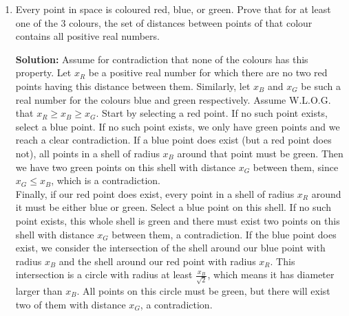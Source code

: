 \documentclass{article}
\begin{document}
\begin{enumerate}[itemsep=\fill]
\item %
Every point in space is coloured red, blue, or green. Prove that for at least one of the 3 colours, the set of distances between points of that colour contains all positive real numbers.

\textbf{Solution:} Assume for contradiction that none of the colours has this property. Let $x_R$ be a positive real number for which there are no two red points having this distance between them. Similarly, let $x_B$ and $x_G$ be such a real number for the colours blue and green respectively. Assume W.L.O.G. that $x_R\geq x_B \geq x_G$. Start by selecting a red point. If no such point exists, select a blue point. If no such point exists, we only have green points and we reach a clear contradiction. If a blue point does exist (but a red point does not), all points in a shell of radius $x_B$ around that point must be green. Then we have two green points on this shell with distance $x_G$ between them, since $x_G\leq x_B$, which is a contradiction.\\
Finally, if our red point does exist, every point in a shell of radius $x_R$ around it must be either blue or green. Select a blue point on this shell. If no such point exists, this whole shell is green and there must exist two points on this shell with distance $x_G$ between them, a contradiction. If the blue point does exist, we consider the intersection of the shell around our blue point with radius $x_B$ and the shell around our red point with radius $x_R$. This intersection is a circle with radius at least $\frac{x_B}{\sqrt{2}}$, which means it has diameter larger than $x_B$. All points on this circle must be green, but there will exist two of them with distance $x_G$, a contradiction.

\end{enumerate}
\end{document}
